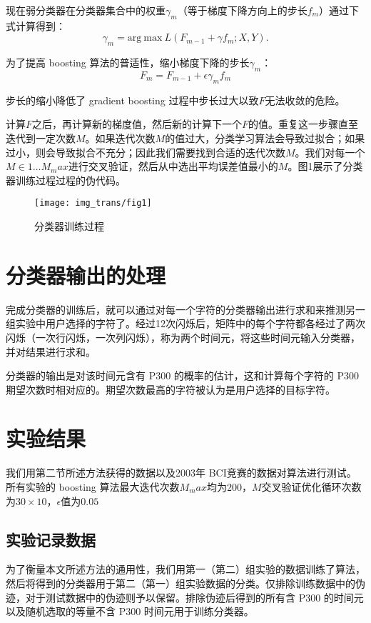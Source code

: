 \documentclass[a4paper]{ecust_thesis_translation}
\renewcommand\![1]{\immature{#1}}
\begin{document}
现在弱分类器在分类器集合中的权重$\gamma_m$（等于梯度下降方向上的步长$f_m$）通过下式计算得到：
\begin{equation}
  \gamma_m=\mathrm{arg}\ \mathrm{max}\ L(F_{m-1}+\gamma f_m; X, Y).
\end{equation}

为了提高 boosting 算法的普适性，缩小梯度下降的步长$\gamma_m$：
\begin{equation}
  F_m=F_{m-1}+\epsilon \gamma_m f_m
\end{equation}

步长的缩小降低了 gradient boosting 过程中步长过大以致$F$无法收敛的危险。

计算$F$之后，再计算新的梯度值，然后新的计算下一个$F$的值。重复这一步骤直至迭代到一定次数$M$。如果迭代次数$M$的值过大，分类学习算法会导致过拟合；如果过小，则会导致拟合不充分；因此我们需要找到合适的迭代次数$M$。我们对每一个$M\in 1\ldots M_max$进行交叉验证，然后从中选出平均误差值最小的$M$。图1展示了分类器训练过程过程的伪代码。

\begin{figure}[ht]
  \texttt{[image: img\_trans/fig1]}
  \caption{分类器训练过程}
\end{figure}

\section{分类器输出的处理}
完成分类器的训练后，就可以通过对每一个字符的分类器输出进行求和来推测另一组实验中用户选择的字符了。经过12次闪烁后，矩阵中的每个字符都各经过了两次闪烁（一次行闪烁，一次列闪烁），称为两个时间元，将这些时间元输入分类器，并对结果进行求和。

分类器的输出是对该时间元含有 P300 的概率的估计，这和计算每个字符的 P300 期望次数时相对应的。期望次数最高的字符被认为是用户选择的目标字符。

\section{实验结果}
我们用第二节所述方法获得的数据以及2003年 BCI竞赛的数据对算法进行测试。所有实验的 boosting 算法最大迭代次数$M_max$均为200，$M$交叉验证优化循环次数为$30\times 10$，$\epsilon$值为$0.05$
\subsection{实验记录数据}
为了衡量本文所述方法的通用性，我们用第一（第二）组实验的数据训练了算法，然后将得到的分类器用于第二（第一）组实验数据的分类。仅排除训练数据中的伪迹，对于测试数据中的伪迹则予以保留。排除伪迹后得到的所有含 P300 的时间元以及随机选取的等量不含 P300 时间元用于训练分类器。
\end{document}
